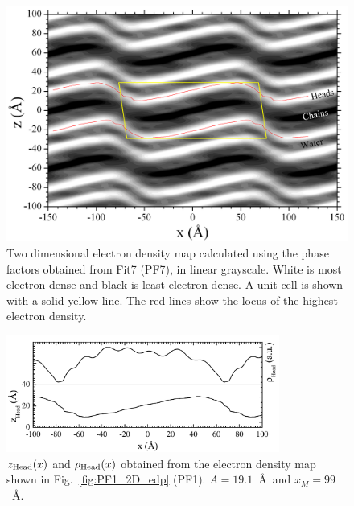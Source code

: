 \begin{landscape}
\begin{figure}
  \centering
  \includegraphics[width=0.85\linewidth]{figures/ripple/LAXS/Fit7_2D_edp}
  \caption[Two dimensional electron density map calculated using the phase
  factors obtained from Fit7 (PF7), in linear grayscale]
  {Two dimensional electron density map calculated using the phase
  factors obtained from Fit7 (PF7), in linear grayscale.
  White is most electron dense and black is least electron dense. 
  A unit cell is shown with a solid yellow line. 
  The red lines show the locus of the highest electron density.}
  \label{fig:PF7_2D_edp}
\end{figure} 
\end{landscape}

\begin{figure}[htbp]
  \centering
  \includegraphics[width=0.8\textwidth]{figures/ripple/LAXS/PF1_headgroup}
  \caption[$\zhead(x)$ and $\rhohead(x)$ obtained from the electron density map
  shown in Fig.~\ref{fig:PF1_2D_edp} (PF1)]
  {$\zhead(x)$ and $\rhohead(x)$ obtained from the electron density map
  shown in Fig.~\ref{fig:PF1_2D_edp} (PF1).
  $A = 19.1$~\AA\ and $x_M = 99$~\AA.}
  \label{fig:PF1_headgroup}
\end{figure}

